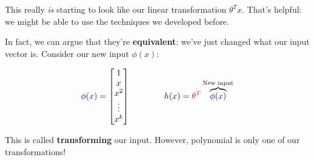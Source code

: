         This really \textit{is} starting to look like our linear transformation $\theta^T x$. That's helpful: we might be able to use the techniques we developed before.

        In fact, we can argue that they're \textbf{equivalent}: we've just changed what our input vector is. Consider our new input $\phi(x)$:

        \begin{equation}
            \textcolor{blue}{\phi(x)}
            = 
            \begin{bmatrix}
                1 \\ x \\ x^2 \\ \vdots \\ x^k
            \end{bmatrix}
            \qquad \qquad
            h(x) = 
            \textcolor{red}{\theta^T} 
            \overbrace{
            \textcolor{blue}{\phi(x)}
            }^{\text{New input}}
        \end{equation}
        
        This is called \textbf{transforming} our input. However, polynomial is only one of our transformations!\\

